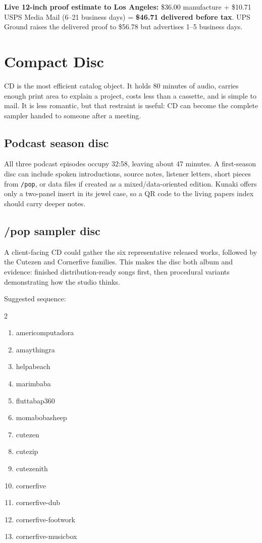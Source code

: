 \documentclass[11pt]{article}
\newcommand{\mediumtitle}[1]{\section*{\Huge\color{acpink}#1}}
\begin{document}
\textbf{Live 12-inch proof estimate to Los Angeles:} \$36.00 manufacture + \$10.71 USPS Media Mail (6--21 business days) = \textbf{\$46.71 delivered before tax}. UPS Ground raises the delivered proof to \$56.78 but advertises 1--5 business days.

\clearpage
\mediumtitle{Compact Disc}

CD is the most efficient catalog object. It holds 80 minutes of audio, carries enough print area to explain a project, costs less than a cassette, and is simple to mail. It is less romantic, but that restraint is useful: CD can become the complete sampler handed to someone after a meeting.

\subsection*{Podcast season disc}

All three podcast episodes occupy 32:58, leaving about 47 minutes. A first-season disc can include spoken introductions, source notes, listener letters, short pieces from \texttt{/pop}, or data files if created as a mixed/data-oriented edition. Kunaki offers only a two-panel insert in its jewel case, so a QR code to the living papers index should carry deeper notes.

\subsection*{/pop sampler disc}

A client-facing CD could gather the six representative released works, followed by the Cutezen and Cornerfive families. This makes the disc both album and evidence: finished distribution-ready songs first, then procedural variants demonstrating how the studio thinks.

Suggested sequence:

\begin{multicols}{2}
\begin{enumerate}
  \item americomputadora
  \item amaythingra
  \item helpabeach
  \item marimbaba
  \item fluttabap360
  \item momabobasheep
  \item cutezen
  \item cutezip
  \item cutezenith
  \item cornerfive
  \item cornerfive-dub
  \item cornerfive-footwork
  \item cornerfive-musicbox
\end{enumerate}
\end{multicols}
\end{document}

